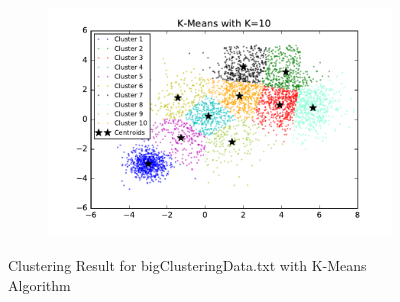 \begin{description}
\begin{figure}[htb]
\begin{subfigure}[b]{0.475\textwidth}
            \includegraphics[width=\textwidth]{./figures/bigClustering_kMeans_10.pdf}
        \end{subfigure}
        
        \caption{Clustering Result for bigClusteringData.txt with K-Means Algorithm}
        \label{fig:kmean_clustering}
\end{figure}


\end{description}
